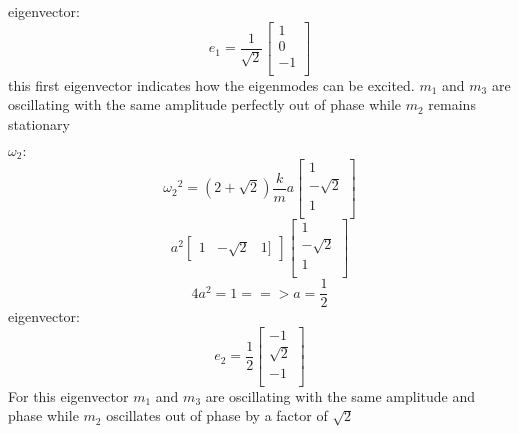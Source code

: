 \documentclass[11pt, oneside]{article}   	%
\begin{document}
eigenvector:
\begin{equation}
e_1 = \frac{1}{\sqrt{2}}
\begin{bmatrix}
    1 \\
    0 \\
    -1 \\
\end{bmatrix}
\end{equation}
this first eigenvector indicates how the eigenmodes can be excited. $m_1$ and $m_3$ are oscillating with the same amplitude perfectly out of phase while $m_2$ remains stationary \par $\omega_2:$
\begin{equation}
{\omega_2}^2 = (2 + \sqrt{2})\frac{k}{m}
a
\begin{bmatrix}
    1 \\
    -\sqrt{2} \\
    1 \\
\end{bmatrix}
\end{equation}
\begin{equation}
a^2
\begin{bmatrix}
 1 & -\sqrt{2} & 1]
\end{bmatrix}
\begin{bmatrix}
    1 \\
    -\sqrt{2} \\
    1 \\
\end{bmatrix}
\end{equation}
\begin{equation}
4a^2 = 1 ==> a = \frac{1}{2}
\end{equation}
eigenvector: 
\begin{equation}
e_2 = \frac{1}{2}
\begin{bmatrix}
    -1 \\
    \sqrt{2} \\
    -1 \\
\end{bmatrix}
\end{equation}
For this eigenvector $m_1$ and $m_3$ are oscillating with the same amplitude and phase while $m_2$ oscillates out of phase by a factor of $\sqrt{2}$
\end{document}
